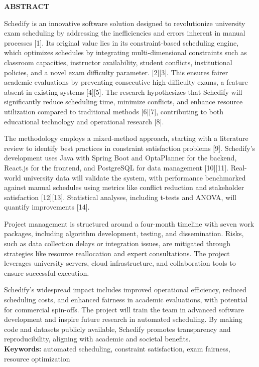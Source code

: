 \documentclass[10pt,a4paper]{article}
\newcommand{\sectionlabel}[1]{\vspace{1.2em}\noindent\textbf{\fontsize{10.5}{12}\selectfont #1}\par\vspace{0.4em}}
\begin{document}
\sectionlabel{ABSTRACT}
\begin{tcolorbox}
Schedify is an innovative software solution designed to revolutionize university exam scheduling by addressing the inefficiencies and errors inherent in manual processes [1]. Its original value lies in its constraint-based scheduling engine, which optimizes schedules by integrating multi-dimensional constraints such as classroom capacities, instructor availability, student conflicts, institutional policies, and a novel exam difficulty parameter. [2][3]. This ensures fairer academic evaluations by preventing consecutive high-difficulty exams, a feature absent in existing systems [4][5]. The research hypothesizes that Schedify will significantly reduce scheduling time, minimize conflicts, and enhance resource utilization compared to traditional methods [6][7], contributing to both educational technology and operational research [8].

The methodology employs a mixed-method approach, starting with a literature review to identify best practices in constraint satisfaction problems [9]. Schedify’s development uses Java with Spring Boot and OptaPlanner for the backend, React.js for the frontend, and PostgreSQL for data management [10][11]. Real-world university data will validate the system, with performance benchmarked against manual schedules using metrics like conflict reduction and stakeholder satisfaction [12][13]. Statistical analyses, including t-tests and ANOVA, will quantify improvements [14].

Project management is structured around a four-month timeline with seven work packages, including algorithm development, testing, and dissemination. Risks, such as data collection delays or integration issues, are mitigated through strategies like resource reallocation and expert consultations. The project leverages university servers, cloud infrastructure, and collaboration tools to ensure successful execution.

Schedify's widespread impact includes improved operational efficiency, reduced scheduling costs, and enhanced fairness in academic evaluations, with potential for commercial spin-offs. The project will train the team in advanced software development and inspire future research in automated scheduling. By making code and datasets publicly available, Schedify promotes transparency and reproducibility, aligning with academic and societal benefits.\\[1em]
\textbf{Keywords:} automated scheduling, constraint satisfaction, exam fairness, resource optimization
\end{tcolorbox}
\end{document}
